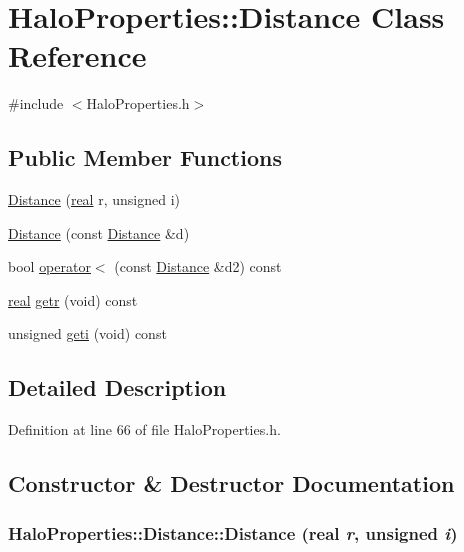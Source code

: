 \section{HaloProperties::Distance Class Reference}
\label{classHaloProperties_1_1Distance}


{\ttfamily \#include $<$HaloProperties.h$>$}

\subsection*{Public Member Functions}
\begin{DoxyCompactItemize}
\item 
\hyperlink{classHaloProperties_1_1Distance_a20431eb98d7e4f79f26b346d68b4917b}{Distance} (\hyperlink{Global_8h_a031f8951175b43076c2084a6c2173410}{real} r, unsigned i)
\item 
\hyperlink{classHaloProperties_1_1Distance_a594dfe62444d01c25086c49a08943f2b}{Distance} (const \hyperlink{classHaloProperties_1_1Distance}{Distance} \&d)
\item 
bool \hyperlink{classHaloProperties_1_1Distance_aa0a4fa026c788c56c9a2fc404df9402c}{operator$<$} (const \hyperlink{classHaloProperties_1_1Distance}{Distance} \&d2) const 
\item 
\hyperlink{Global_8h_a031f8951175b43076c2084a6c2173410}{real} \hyperlink{classHaloProperties_1_1Distance_a22fd65c6215b7dbf9d0bd9770df8983f}{getr} (void) const 
\item 
unsigned \hyperlink{classHaloProperties_1_1Distance_ac766c39cfbe332a30b59b833cdc5a539}{geti} (void) const 
\end{DoxyCompactItemize}


\subsection{Detailed Description}


Definition at line 66 of file HaloProperties.h.



\subsection{Constructor \& Destructor Documentation}
\subsubsection[{Distance}]{\setlength{\rightskip}{0pt plus 5cm}HaloProperties::Distance::Distance ({\bf real} {\em r}, \/  unsigned {\em i})}\label{classHaloProperties_1_1Distance_a20431eb98d7e4f79f26b346d68b4917b}


